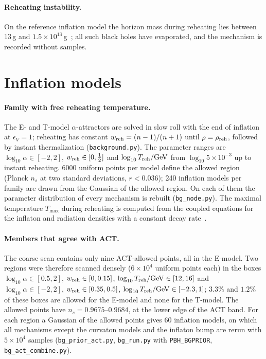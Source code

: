 \documentclass[aps,prd,onecolumn,superscriptaddress,nofootinbib,floatfix]{revtex4-2}
\newcommand{\Treh}{T_{\rm reh}}
\newcommand{\wreh}{w_{\rm reh}}
\newcommand{\code}[1]{\texttt{#1}}
\begin{document}
\paragraph*{Reheating instability.}
On the reference inflation model the horizon mass during reheating lies between $13$\,g and $1.5\times10^{13}$\,g~\cite{Martin:2019nuw}; all such black holes have evaporated, and the mechanism is recorded without samples.

\section{Inflation models}\label{sec:infl}

\paragraph*{Family with free reheating temperature.}
The E- and T-model $\alpha$-attractors are solved in slow roll with the end of inflation at $\epsilon_V=1$; reheating has constant $\wreh=(n-1)/(n+1)$ until $\rho=\rho_{\rm reh}$, followed by instant thermalization (\code{background.py}). The parameter ranges are $\log_{10}\alpha\in[-2,2]$, $\wreh\in[0,\frac12]$ and $\log_{10}\Treh/{\rm GeV}$ from $\log_{10}5\times10^{-3}$ up to instant reheating. 6000 uniform points per model define the allowed region (Planck $n_s$ at two standard deviations, $r<0.036$); 240 inflation models per family are drawn from the Gaussian of the allowed region. On each of them the parameter distribution of every mechanism is rebuilt (\code{bg\_node.py}). The maximal temperature $T_{\max}$ during reheating is computed from the coupled equations for the inflaton and radiation densities with a constant decay rate~\cite{Giudice:2000ex}.

\paragraph*{Members that agree with ACT.}
The coarse scan contains only nine ACT-allowed points, all in the E-model. Two regions were therefore scanned densely ($6\times10^{4}$ uniform points each) in the boxes $\log_{10}\alpha\in[0.5,2]$, $\wreh\in[0,0.15]$, $\log_{10}\Treh/{\rm GeV}\in[12,16]$ and $\log_{10}\alpha\in[-2,2]$, $\wreh\in[0.35,0.5]$, $\log_{10}\Treh/{\rm GeV}\in[-2.3,1]$; $3.3\%$ and $1.2\%$ of these boxes are allowed for the E-model and none for the T-model. The allowed points have $n_s=0.9675$--$0.9684$, at the lower edge of the ACT band. For each region a Gaussian of the allowed points gives 60 inflation models, on which all mechanisms except the curvaton models and the inflaton bump are rerun with $5\times10^{4}$ samples (\code{bg\_prior\_act.py}, \code{bg\_run.py} with \code{PBH\_BGPRIOR}, \code{bg\_act\_combine.py}).
\end{document}
